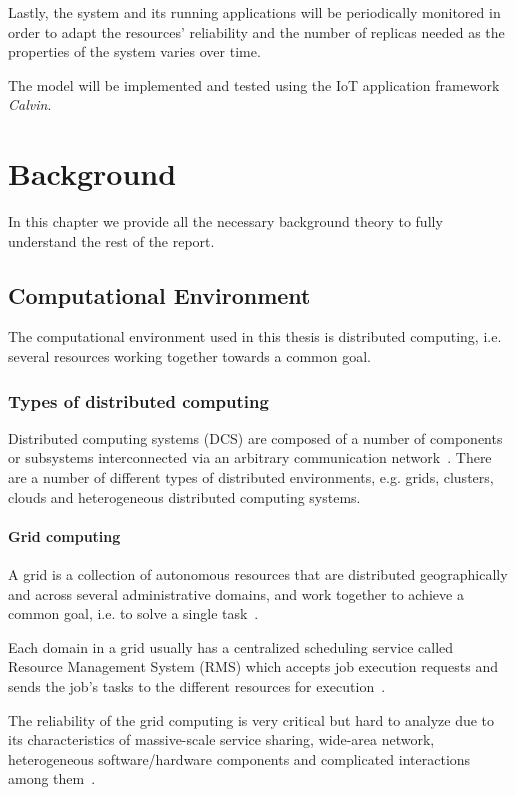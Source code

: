 \documentclass{cslthse-msc}
\begin{document}
Lastly, the system and its running applications will be periodically monitored in order to adapt the resources' reliability and the number of replicas needed as the properties of the system varies over time.

The model will be implemented and tested using the IoT application framework \emph{Calvin}.

\chapter{Background} \label{ch:background}
In this chapter we provide all the necessary background theory to fully understand the rest of the report.
\section{Computational Environment} \label{sec:background_comp_env}
The computational environment used in this thesis is distributed computing, i.e. several resources working together towards a common goal.

\subsection{Types of distributed computing} \label{subsec:background_types_of_distr_comp}
Distributed computing systems (DCS) are composed of a number of components or subsystems interconnected via an arbitrary communication network~\cite{relModelDistSimSystem, efficientRelAnalysisAlgo}. There are a number of different types of distributed environments, e.g. grids, clusters, clouds and heterogeneous distributed computing systems.

\subsubsection{Grid computing}
A grid is a collection of autonomous resources that are distributed geographically and across several administrative domains, and work together to achieve a common goal, i.e. to solve a single task~\cite{compStudyLoadAndCloud, relAndPerfGridServices, evalOfGridRel}.

Each domain in a grid usually has a centralized scheduling service called Resource Management System (RMS) which accepts job execution requests and sends the job's tasks to the different resources for execution~\cite{evalOfGridRel}.

The reliability of the grid computing is very critical but hard to analyze due to its characteristics of massive-scale service sharing, wide-area network, heterogeneous software/hardware components and complicated interactions among them~\cite{cloudServiceRel}.
\end{document}
